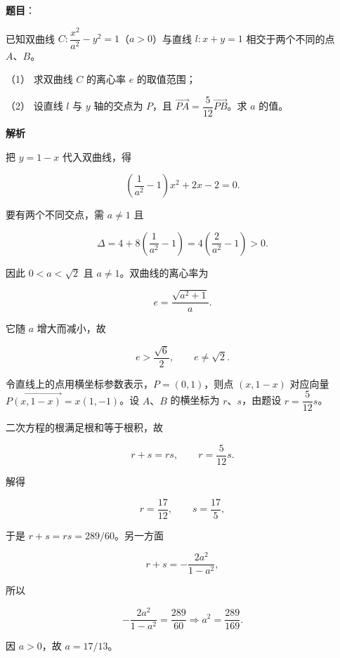 \begin{answer}

\textbf{题目}：

已知双曲线 $C:\dfrac{x^2}{a^2}-y^2=1$（$a>0$）与直线 $l:x+y=1$ 相交于两个不同的点 $A\text{、}B$。

（1） 求双曲线 $C$ 的离心率 $e$ 的取值范围；

（2） 设直线 $l$ 与 $y$ 轴的交点为 $P$，且 $\overrightarrow{PA}=\dfrac5{12}\overrightarrow{PB}$。求 $a$ 的值。

\textbf{解析}


把 $y=1-x$ 代入双曲线，得

\nopagebreak[4]
\[
\left(\frac1{a^2}-1\right)x^2+2x-2=0.
\]

要有两个不同交点，需 $a\ne1$ 且

\nopagebreak[4]
\[
\Delta=4+8\left(\frac1{a^2}-1\right)
=4\left(\frac2{a^2}-1\right)>0.
\]

因此 $0<a<\sqrt2$ 且 $a\ne1$。双曲线的离心率为

\nopagebreak[4]
\[
e=\frac{\sqrt{a^2+1}}a.
\]

它随 $a$ 增大而减小，故

\nopagebreak[4]
\[
e>\frac{\sqrt6}{2},\qquad e\ne\sqrt2.
\]


令直线上的点用横坐标参数表示，$P=(0,1)$，则点 $(x,1-x)$ 对应向量 $\overrightarrow{P(x,1-x)}=x(1,-1)$。设 $A\text{、}B$ 的横坐标为 $r\text{、}s$，由题设 $r=\dfrac5{12}s$。

二次方程的根满足根和等于根积，故

\nopagebreak[4]
\[
r+s=rs,\qquad r=\frac5{12}s.
\]

解得

\nopagebreak[4]
\[
r=\frac{17}{12},\qquad s=\frac{17}{5},
\]

于是 $r+s=rs=289/60$。另一方面

\nopagebreak[4]
\[
r+s=-\frac{2a^2}{1-a^2},
\]

所以

\nopagebreak[4]
\[
-\frac{2a^2}{1-a^2}=\frac{289}{60}
\Longrightarrow a^2=\frac{289}{169}.
\]

因 $a>0$，故 $a=17/13$。



\end{answer}